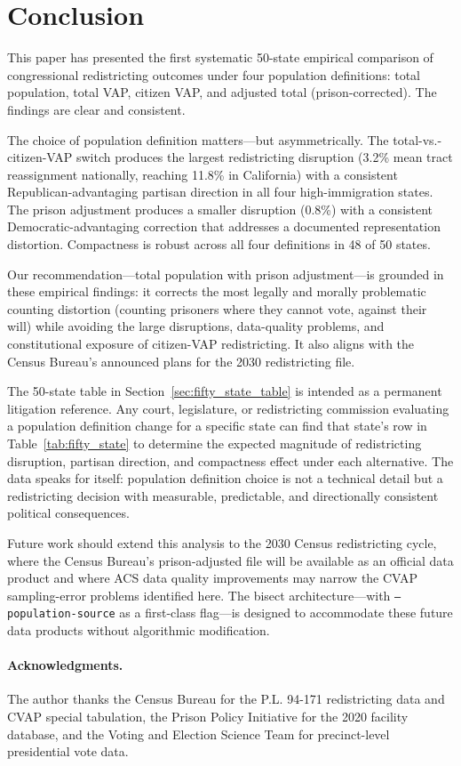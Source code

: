 \section{Conclusion}
\label{sec:conclusion}

This paper has presented the first systematic 50-state empirical comparison of congressional redistricting outcomes under four population definitions: total population, total VAP, citizen VAP, and adjusted total (prison-corrected). The findings are clear and consistent.

The choice of population definition matters---but asymmetrically. The total-vs.-citizen-VAP switch produces the largest redistricting disruption (3.2\% mean tract reassignment nationally, reaching 11.8\% in California) with a consistent Republican-advantaging partisan direction in all four high-immigration states. The prison adjustment produces a smaller disruption (0.8\%) with a consistent Democratic-advantaging correction that addresses a documented representation distortion. Compactness is robust across all four definitions in 48 of 50 states.

Our recommendation---total population with prison adjustment---is grounded in these empirical findings: it corrects the most legally and morally problematic counting distortion (counting prisoners where they cannot vote, against their will) while avoiding the large disruptions, data-quality problems, and constitutional exposure of citizen-VAP redistricting. It also aligns with the Census Bureau's announced plans for the 2030 redistricting file.

The 50-state table in Section~\ref{sec:fifty_state_table} is intended as a permanent litigation reference. Any court, legislature, or redistricting commission evaluating a population definition change for a specific state can find that state's row in Table~\ref{tab:fifty_state} to determine the expected magnitude of redistricting disruption, partisan direction, and compactness effect under each alternative. The data speaks for itself: population definition choice is not a technical detail but a redistricting decision with measurable, predictable, and directionally consistent political consequences.

Future work should extend this analysis to the 2030 Census redistricting cycle, where the Census Bureau's prison-adjusted file will be available as an official data product and where ACS data quality improvements may narrow the CVAP sampling-error problems identified here. The bisect architecture---with \texttt{--population-source} as a first-class flag---is designed to accommodate these future data products without algorithmic modification.

\paragraph{Acknowledgments.}
The author thanks the Census Bureau for the P.L. 94-171 redistricting data and CVAP special tabulation, the Prison Policy Initiative for the 2020 facility database, and the Voting and Election Science Team for precinct-level presidential vote data.
